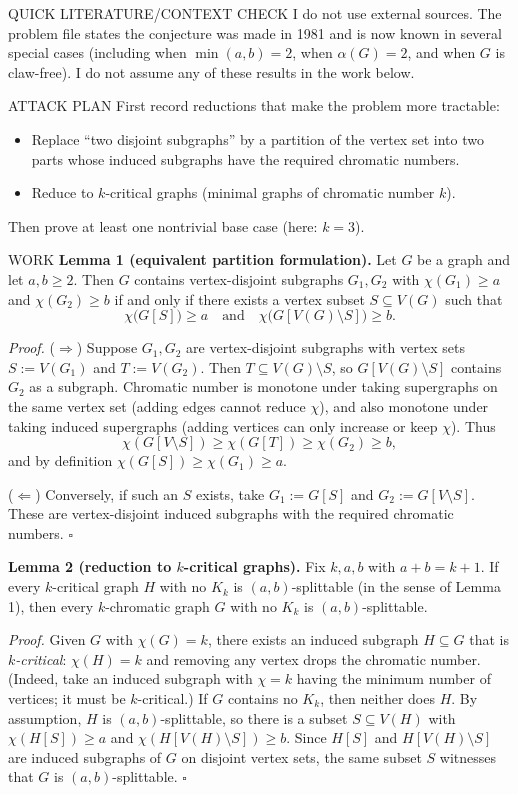 QUICK LITERATURE/CONTEXT CHECK
I do not use external sources.
The problem file states the conjecture was made in 1981 and is now known in
several special cases (including when $\min(a,b)=2$, when $\alpha(G)=2$, and when
$G$ is claw-free).
I do not assume any of these results in the work below.

ATTACK PLAN
First record reductions that make the problem more tractable:
\begin{itemize}
\item Replace ``two disjoint subgraphs'' by a partition of the vertex set into two
parts whose induced subgraphs have the required chromatic numbers.
\item Reduce to $k$-critical graphs (minimal graphs of chromatic number $k$).
\end{itemize}
Then prove at least one nontrivial base case (here: $k=3$).

WORK
\textbf{Lemma 1 (equivalent partition formulation).}
Let $G$ be a graph and let $a,b\ge2$.
Then $G$ contains vertex-disjoint subgraphs $G_1,G_2$ with
$\chi(G_1)\ge a$ and $\chi(G_2)\ge b$
if and only if there exists a vertex subset $S\subseteq V(G)$ such that
\[
\chi\bigl(G[S]\bigr)\ge a\quad\text{and}\quad \chi\bigl(G[V(G)\setminus S]\bigr)\ge b.
\]

\emph{Proof.}
($\Rightarrow$) Suppose $G_1,G_2$ are vertex-disjoint subgraphs with vertex sets
$S:=V(G_1)$ and $T:=V(G_2)$.
Then $T\subseteq V(G)\setminus S$, so
$G[V(G)\setminus S]$ contains $G_2$ as a subgraph.
Chromatic number is monotone under taking supergraphs on the same vertex set
(adding edges cannot reduce $\chi$), and also monotone under taking induced
supergraphs (adding vertices can only increase or keep $\chi$).
Thus
\[
\chi(G[V\setminus S]) \ge \chi(G[T]) \ge \chi(G_2) \ge b,
\]
and by definition $\chi(G[S])\ge \chi(G_1)\ge a$.

($\Leftarrow$) Conversely, if such an $S$ exists, take $G_1:=G[S]$ and
$G_2:=G[V\setminus S]$. These are vertex-disjoint induced subgraphs with the
required chromatic numbers.
\hfill $\square$

\medskip
\textbf{Lemma 2 (reduction to $k$-critical graphs).}
Fix $k,a,b$ with $a+b=k+1$.
If every $k$-critical graph $H$ with no $K_k$ is $(a,b)$-splittable (in the sense
of Lemma 1), then every $k$-chromatic graph $G$ with no $K_k$ is
$(a,b)$-splittable.

\emph{Proof.}
Given $G$ with $\chi(G)=k$, there exists an induced subgraph $H\subseteq G$ that is
\emph{$k$-critical}: $\chi(H)=k$ and removing any vertex drops the chromatic number.
(Indeed, take an induced subgraph with $\chi=k$ having the minimum number of
vertices; it must be $k$-critical.)
If $G$ contains no $K_k$, then neither does $H$.
By assumption, $H$ is $(a,b)$-splittable, so there is a subset
$S\subseteq V(H)$ with $\chi(H[S])\ge a$ and $\chi(H[V(H)\setminus S])\ge b$.
Since $H[S]$ and $H[V(H)\setminus S]$ are induced subgraphs of $G$ on disjoint
vertex sets, the same subset $S$ witnesses that $G$ is $(a,b)$-splittable.
\hfill $\square$

